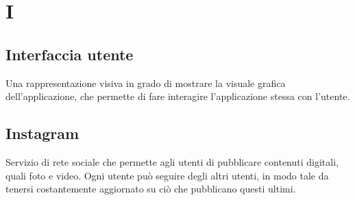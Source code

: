 \section{I}

\subsection{Interfaccia utente} Una rappresentazione visiva in grado di mostrare la visuale grafica dell’applicazione, che permette di fare interagire l’applicazione stessa con l’utente.

\subsection{Instagram} Servizio di rete sociale che permette agli utenti di pubblicare contenuti digitali, quali foto e video. Ogni utente può seguire degli altri utenti, in modo tale da tenersi costantemente aggiornato su ciò che pubblicano questi ultimi.

\clearpage